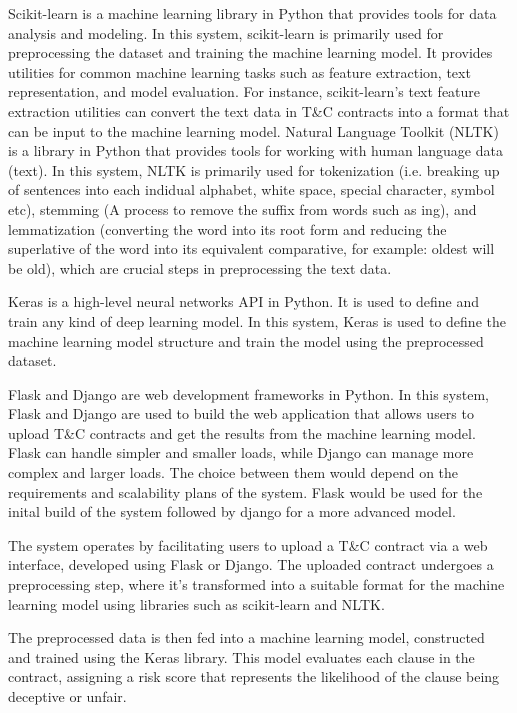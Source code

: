 Scikit-learn is a machine learning library in Python that provides tools for data analysis and modeling. In this system, scikit-learn is primarily used for preprocessing the dataset and training the machine learning model. It provides utilities for common machine learning tasks such as feature extraction, text representation, and model evaluation. For instance, scikit-learn's text feature extraction utilities can convert the text data in T&C contracts into a format that can be input to the machine learning model.
Natural Language Toolkit (NLTK) is a library in Python that provides tools for working with human language data (text).  In this system, NLTK is primarily used for tokenization (i.e. breaking up of sentences into each indidual alphabet, white space, special character, symbol etc), stemming (A process to remove the suffix from words such as ing), and lemmatization (converting the word into its root form and reducing the superlative of the word into its equivalent comparative, for example: oldest will be old), which are crucial steps in preprocessing the text data.

Keras is a high-level neural networks API in Python.  
It is used to define and train any kind of deep learning model. In this system, Keras is used to define the machine learning model structure and train the model using the preprocessed dataset.

Flask and Django are web development frameworks in Python.  In this system, Flask and Django are used to build the web application that allows users to upload T&C contracts and get the results from the machine learning model. Flask can handle simpler and smaller loads, while Django can manage more complex and larger loads. The choice between them would depend on the requirements and scalability plans of the system. Flask would be used for the inital build of the system followed by django for a more advanced model. 

The system operates by facilitating users to upload a T&C contract via a web interface, developed using Flask or Django. The uploaded contract undergoes a preprocessing step, where it's transformed into a suitable format for the machine learning model using libraries such as scikit-learn and NLTK.

The preprocessed data is then fed into a machine learning model, constructed and trained using the Keras library. This model evaluates each clause in the contract, assigning a risk score that represents the likelihood of the clause being deceptive or unfair.

